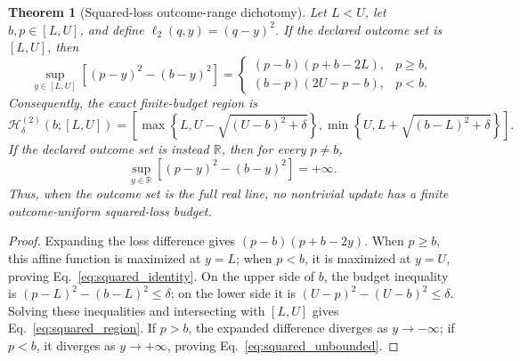 \documentclass[11pt]{article}
\newtheorem{theorem}{Theorem}
\newcommand{\R}{\mathbb{R}}
\begin{document}
\begin{theorem}[Squared-loss outcome-range dichotomy]
\label{thm:squared_geometry}
Let $L<U$, let $b,p\in[L,U]$, and define $\ell_2(q,y)=(q-y)^2$. If the declared outcome set is $[L,U]$, then
\begin{equation}
  \sup_{y\in[L,U]}\left[(p-y)^2-(b-y)^2\right]
  =
  \begin{cases}
    (p-b)(p+b-2L), & p\geq b,\\
    (b-p)(2U-p-b), & p<b.
  \end{cases}
  \label{eq:squared_identity}
\end{equation}
Consequently, the exact finite-budget region is
\begin{equation}
  \mathcal H^{(2)}_{\delta}(b;[L,U])
  =\left[
  \max\!\left\{L,U-\sqrt{(U-b)^2+\delta}\right\},
  \min\!\left\{U,L+\sqrt{(b-L)^2+\delta}\right\}
  \right].
  \label{eq:squared_region}
\end{equation}
If the declared outcome set is instead $\R$, then for every $p\neq b$,
\begin{equation}
  \sup_{y\in\R}\left[(p-y)^2-(b-y)^2\right]=+\infty.
  \label{eq:squared_unbounded}
\end{equation}
Thus, when the outcome set is the full real line, no nontrivial update has a finite outcome-uniform squared-loss budget.
\end{theorem}
\begin{proof}
Expanding the loss difference gives $(p-b)(p+b-2y)$. When $p\geq b$, this affine function is maximized at $y=L$; when $p<b$, it is maximized at $y=U$, proving Eq.~\eqref{eq:squared_identity}. On the upper side of $b$, the budget inequality is $(p-L)^2-(b-L)^2\leq\delta$; on the lower side it is $(U-p)^2-(U-b)^2\leq\delta$. Solving these inequalities and intersecting with $[L,U]$ gives Eq.~\eqref{eq:squared_region}. If $p>b$, the expanded difference diverges as $y\to-\infty$; if $p<b$, it diverges as $y\to+\infty$, proving Eq.~\eqref{eq:squared_unbounded}.
\end{proof}
\end{document}

